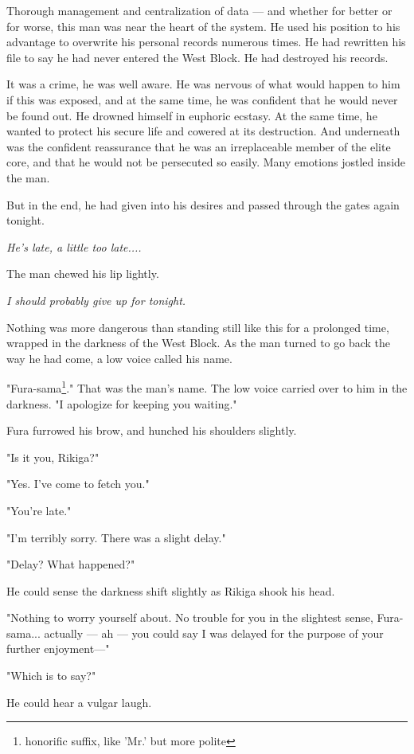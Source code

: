 Thorough management and centralization of data --- and whether for better
or for worse, this man was near the heart of the system. He used his
position to his advantage to overwrite his personal records numerous
times. He had rewritten his file to say he had never entered the West
Block. He had destroyed his records.

It was a crime, he was well aware. He was nervous of what would happen
to him if this was exposed, and at the same time, he was confident that
he would never be found out. He drowned himself in euphoric ecstasy. At
the same time, he wanted to protect his secure life and cowered at its
destruction. And underneath was the confident reassurance that he was an
irreplaceable member of the elite core, and that he would not be
persecuted so easily. Many emotions jostled inside the man.

But in the end, he had given into his desires and passed through the
gates again tonight.

\emph{He's late, a little too late....}

The man chewed his lip lightly.

\emph{I should probably give up for tonight.}

Nothing was more dangerous than standing still like this for a prolonged
time, wrapped in the darkness of the West Block. As the man turned to go
back the way he had come, a low voice called his name.

"Fura-sama\footnote{honorific suffix, like 'Mr.' but more polite}." That was the man's name. The low voice carried over to him
in the darkness. "I apologize for keeping you waiting."

Fura furrowed his brow, and hunched his shoulders slightly.

"Is it you, Rikiga?"

"Yes. I've come to fetch you."

"You're late."

"I'm terribly sorry. There was a slight delay."

"Delay? What happened?"

He could sense the darkness shift slightly as Rikiga shook his head.

"Nothing to worry yourself about. No trouble for you in the slightest
sense, Fura-sama... actually --- ah --- you could say I was delayed for the
purpose of your further enjoyment---"

"Which is to say?"

He could hear a vulgar laugh.

